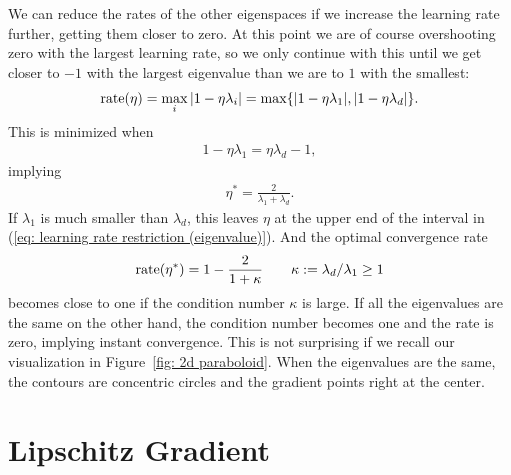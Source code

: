 We can reduce the rates of the other eigenspaces if we
increase the learning rate further, getting them closer to zero. At this point
we are of course overshooting zero with the largest learning rate, so we only
continue with this until we get closer to \(-1\) with the largest eigenvalue
than we are to \(1\) with the smallest:
%
\begin{align*}
	\text{rate}(\eta)=\max_{i} |1-\eta\lambda_i| = \max\{|1-\eta\lambda_1|, |1-\eta\lambda_d|\}.
\end{align*}
%
This is minimized when
%
\begin{align*}
	1-\eta\lambda_1 = \eta\lambda_d -1,
\end{align*}
%
implying
%
\begin{align*}
	\eta^* = \frac{2}{\lambda_1 + \lambda_d}.
\end{align*}
%
If \(\lambda_1\) is much smaller than \(\lambda_d\), this leaves \(\eta\)
at the upper end of the interval in (\ref{eq: learning rate restriction
(eigenvalue)}). And the optimal convergence rate
%
\begin{align*}
	\text{rate}(\eta^*)
	= 1 - \frac{2}{1+\kappa}
	\qquad \kappa:=\lambda_d/\lambda_1 \ge 1
\end{align*}
%
becomes close to one if the condition number \(\kappa\) is large.
If all the eigenvalues are the same on the other hand, the condition number
becomes one and the rate is zero, implying instant convergence. This is not
surprising if we recall our visualization in Figure~\ref{fig: 2d paraboloid}.
When the eigenvalues are the same, the contours are concentric circles and the
gradient points right at the center.


\section{Lipschitz Gradient}

